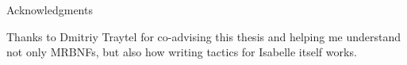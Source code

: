 \thispagestyle{empty}

\vspace*{20mm}

\begin{center}
{ Acknowledgments}
\end{center}

\vspace{10mm}

Thanks to Dmitriy Traytel for co-advising this thesis and helping me understand not only \acsp{MRBNF}, but also how writing tactics for Isabelle itself works.

\cleardoublepage{}
